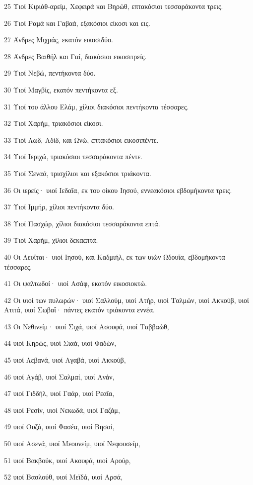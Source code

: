 \par 25 Υιοί Κιριάθ-αρείμ, Χεφειρά και Βηρώθ, επτακόσιοι τεσσαράκοντα τρεις.
\par 26 Υιοί Ραμά και Γαβαά, εξακόσιοι είκοσι και εις.
\par 27 Άνδρες Μιχμάς, εκατόν εικοσιδύο.
\par 28 Άνδρες Βαιθήλ και Γαί, διακόσιοι εικοσιτρείς.
\par 29 Υιοί Νεβώ, πεντήκοντα δύο.
\par 30 Υιοί Μαγβίς, εκατόν πεντήκοντα εξ.
\par 31 Υιοί του άλλου Ελάμ, χίλιοι διακόσιοι πεντήκοντα τέσσαρες.
\par 32 Υιοί Χαρήμ, τριακόσιοι είκοσι.
\par 33 Υιοί Λωδ, Αδίδ, και Ωνώ, επτακόσιοι εικοσιπέντε.
\par 34 Υιοί Ιεριχώ, τριακόσιοι τεσσαράκοντα πέντε.
\par 35 Υιοί Σεναά, τρισχίλιοι και εξακόσιοι τριάκοντα.
\par 36 Οι ιερείς· υιοί Ιεδαΐα, εκ του οίκου Ιησού, εννεακόσιοι εβδομήκοντα τρεις.
\par 37 Υιοί Ιμμήρ, χίλιοι πεντήκοντα δύο.
\par 38 Υιοί Πασχώρ, χίλιοι διακόσιοι τεσσαράκοντα επτά.
\par 39 Υιοί Χαρήμ, χίλιοι δεκαεπτά.
\par 40 Οι Λευΐται· υιοί Ιησού, και Καδμιήλ, εκ των υιών Ωδουΐα, εβδομήκοντα τέσσαρες.
\par 41 Οι ψαλτωδοί· υιοί Ασάφ, εκατόν εικοσιοκτώ.
\par 42 Οι υιοί των πυλωρών· υιοί Σαλλούμ, υιοί Ατήρ, υιοί Ταλμών, υιοί Ακκούβ, υιοί Ατιτά, υιοί Σωβαΐ· πάντες εκατόν τριάκοντα εννέα.
\par 43 Οι Νεθινείμ· υιοί Σιχά, υιοί Ασουφά, υιοί Ταββαώθ,
\par 44 υιοί Κηρώς, υιοί Σιαά, υιοί Φαδών,
\par 45 υιοί Λεβανά, υιοί Αγαβά, υιοί Ακκούβ,
\par 46 υιοί Αγάβ, υιοί Σαλμαί, υιοί Ανάν,
\par 47 υιοί Γιδδήλ, υιοί Γαάρ, υιοί Ρεαΐα,
\par 48 υιοί Ρεσίν, υιοί Νεκωδά, υιοί Γαζάμ,
\par 49 υιοί Ουζά, υιοί Φασέα, υιοί Βησαί,
\par 50 υιοί Ασενά, υιοί Μεουνείμ, υιοί Νεφουσείμ,
\par 51 υιοί Βακβούκ, υιοί Ακουφά, υιοί Αρούρ,
\par 52 υιοί Βασλούθ, υιοί Μεϊδά, υιοί Αρσά,
